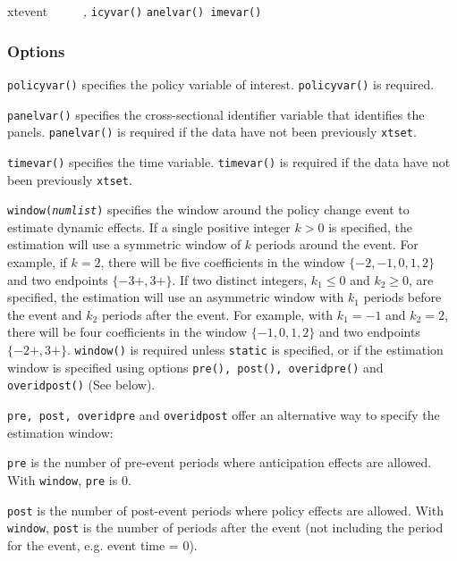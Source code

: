 \documentclass[bib]{./sty/statapress}
\begin{document}
\begin{stsyntax}
xtevent
    \depvar\
    \optindepvars\
    \optif\
    \optin\
    \optweight\
    \emph{,}
    \texttt{icyvar(\varname)}
    \texttt{anelvar(\varname)}\
    \texttt{imevar(\varname)}\

\end{stsyntax}




\subsubsection{Options}
\hangpara
\texttt{policyvar(\varname)} specifies the policy variable of interest. \texttt{policyvar()} is required.

\hangpara
\texttt{panelvar(\varname)} specifies the cross-sectional identifier variable that identifies the panels.
\texttt{panelvar()} is required if the data have not been  previously \texttt{xtset}.

\hangpara
\texttt{timevar(\varname)} specifies the time variable. \texttt{timevar()} is required if the data have not been previously \texttt{xtset}.

\hangpara
{\tt window({\it numlist})} specifies the window around the policy change event to estimate dynamic effects. If a single positive integer $k>0$ is specified, the estimation will use a symmetric window of $k$ periods around the event.
For example, if $k = 2$, there will be five coefficients in the window $\{-2,-1,0,1,2\}$ and two endpoints $\{-3+, 3+\}$.
If two distinct integers, $k_1\le0$ and $k_2\ge0$, are specified, the estimation will use an asymmetric window with $k_1$ periods before the event and $k_2$ periods after the event.
For example, with $k_1 = -1$ and $k_2 = 2$, there will be four coefficients in the window $\{-1,0,1,2\}$ and two endpoints $\{-2+,3+\}$.
{\tt window()} is required unless {\tt static} is specified, or if the estimation window is specified using options {\tt pre(), post(), overidpre()} and {\tt overidpost()} (See below).

\hangpara
{\tt pre, post, overidpre} and {\tt overidpost} offer an alternative way to specify the estimation window:

\morehangpara
{\tt pre} is the number of pre-event periods where anticipation effects are allowed.
With {\tt window}, {\tt pre} is 0.

\morehangpara
{\tt post} is the number of post-event periods where policy effects are allowed.
With {\tt window}, {\tt post} is the number of periods after the event (not including the period for the event, e.g. event time = 0).
\end{document}
